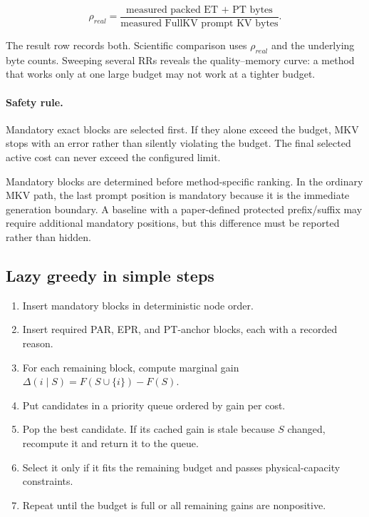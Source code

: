 \documentclass[11pt]{article}
\newcommand{\safety}{\paragraph{Safety rule.}}
\begin{document}
\begin{equation}
  \rho_{real}=\frac{\text{measured packed ET + PT bytes}}
  {\text{measured FullKV prompt KV bytes}}.
\end{equation}

The result row records both. Scientific comparison uses $\rho_{real}$ and the underlying byte
counts. Sweeping several RRs reveals the quality--memory curve: a method that works only at one
large budget may not work at a tighter budget.

\safety Mandatory exact blocks are selected first. If they alone exceed the budget, MKV stops
with an error rather than silently violating the budget. The final selected active cost can never
exceed the configured limit.

Mandatory blocks are determined before method-specific ranking. In the ordinary MKV path, the
last prompt position is mandatory because it is the immediate generation boundary. A baseline
with a paper-defined protected prefix/suffix may require additional mandatory positions, but this
difference must be reported rather than hidden.

\subsection{Lazy greedy in simple steps}

\begin{enumerate}
  \item Insert mandatory blocks in deterministic node order.
  \item Insert required PAR, EPR, and PT-anchor blocks, each with a recorded reason.
  \item For each remaining block, compute marginal gain
        $\Delta(i\mid S)=F(S\cup\{i\})-F(S)$.
  \item Put candidates in a priority queue ordered by gain per cost.
  \item Pop the best candidate. If its cached gain is stale because $S$ changed, recompute it and
        return it to the queue.
  \item Select it only if it fits the remaining budget and passes physical-capacity constraints.
  \item Repeat until the budget is full or all remaining gains are nonpositive.
\end{enumerate}
\end{document}
